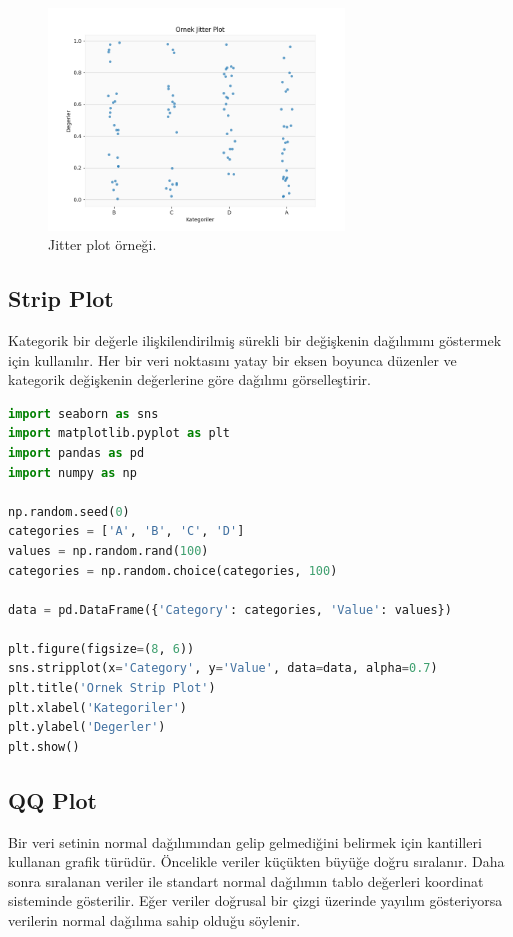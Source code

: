 \begin{figure}[h]
    \centering
    \includegraphics[width=0.7\textwidth]{images/jitter_plot.png}
    \caption{Jitter plot örneği.}
    \label{fig:enter-label}
\end{figure}

\newpage

\subsection{Strip Plot}
Kategorik bir değerle ilişkilendirilmiş sürekli bir değişkenin dağılımını göstermek için kullanılır. Her bir veri noktasını yatay bir eksen boyunca düzenler ve kategorik değişkenin değerlerine göre dağılımı görselleştirir.

\begin{lstlisting}[language=Python]
import seaborn as sns
import matplotlib.pyplot as plt
import pandas as pd
import numpy as np

np.random.seed(0)
categories = ['A', 'B', 'C', 'D']
values = np.random.rand(100)
categories = np.random.choice(categories, 100)

data = pd.DataFrame({'Category': categories, 'Value': values})

plt.figure(figsize=(8, 6))
sns.stripplot(x='Category', y='Value', data=data, alpha=0.7)
plt.title('Ornek Strip Plot')
plt.xlabel('Kategoriler')
plt.ylabel('Degerler')
plt.show()
\end{lstlisting}

\newpage

\subsection{QQ Plot}
Bir veri setinin normal dağılımından gelip gelmediğini belirmek için kantilleri kullanan grafik türüdür. Öncelikle veriler küçükten büyüğe doğru sıralanır. Daha sonra sıralanan veriler ile standart normal dağılımın tablo değerleri koordinat sisteminde gösterilir. Eğer veriler doğrusal bir çizgi üzerinde yayılım gösteriyorsa verilerin normal dağılıma sahip olduğu söylenir.

